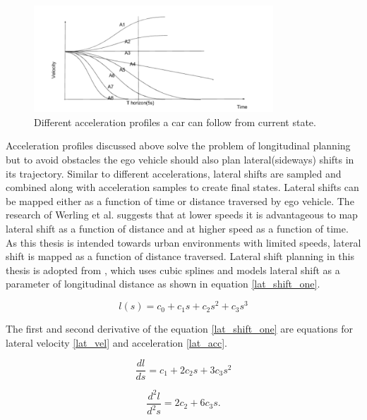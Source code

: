  \begin{figure}[H]
    \centering
    \includegraphics[width=0.8\textwidth]{Images/velcoities.png}
    \caption{Different acceleration profiles a car can follow from current state.}
    \label{velocities}
\end{figure}


Acceleration profiles discussed above solve the problem of longitudinal planning but to avoid obstacles the ego vehicle should also plan lateral(sideways) shifts in its trajectory. Similar to different accelerations, lateral shifts are sampled and combined along with acceleration samples to create final states. Lateral shifts can be mapped either as a function of time or distance traversed by ego vehicle. The research of Werling et al. \cite{werling_frenet} suggests that at lower speeds it is advantageous to map lateral shift as a function of distance and at higher speed as a function of time. As this thesis is intended towards urban environments with limited speeds, lateral shift is mapped as a function of distance traversed. Lateral shift planning in this thesis is adopted from \cite{real_time_traj_plan_article}, which uses cubic splines and models lateral shift as a parameter of longitudinal distance as shown in equation \ref{lat_shift_one}. 

\begin{equation}
l(s) = c_0 + c_1s + c_2s^2 + c_3s^3
\label{lat_shift_one}
\end{equation}

The first and second derivative of the equation \ref{lat_shift_one} are equations for lateral velocity \ref{lat_vel} and acceleration \ref{lat_acc}.

\begin{equation}
    \frac{dl}{ds} = c_1 + 2c_2s + 3c_3s^2
\label{lat_vel}
\end{equation}


\begin{equation}
    \frac{d^2l}{d^2s} = 2c_2 + 6c_3s.
\label{lat_acc}    
\end{equation}

